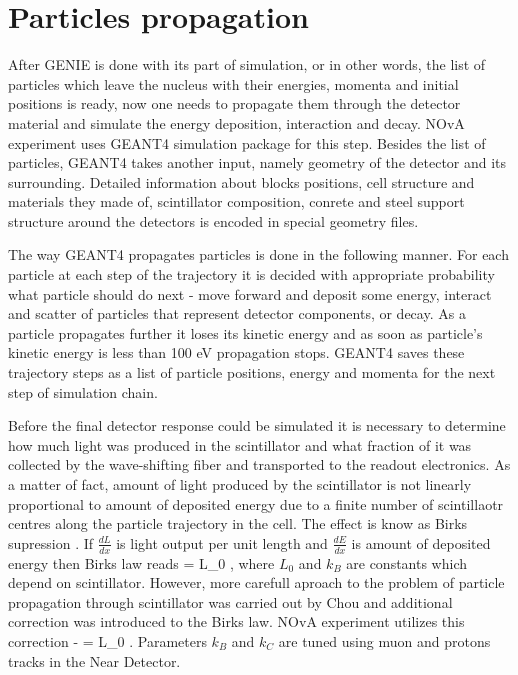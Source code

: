 \section{Particles propagation}
After GENIE is done with its part of simulation, or in other words, the list of particles which leave 
the nucleus with their energies, momenta and initial positions is ready, now one needs to propagate them
through the detector material and simulate the energy deposition, interaction and decay. NOvA experiment
uses GEANT4 \cite{GEANT4} simulation package for this step. Besides the list of particles, GEANT4 takes
another input, namely geometry of the detector and its surrounding. Detailed information about blocks 
positions, cell structure and materials they made of, scintillator composition, conrete and steel support
structure around the detectors is encoded in special geometry files.

The way GEANT4 propagates particles is done in the following manner. For each particle at each step of the 
trajectory it is decided with appropriate probability what particle should do next - move forward and deposit 
some energy, interact and scatter of particles that represent detector components, or decay. As a particle
propagates further it loses its kinetic energy and as soon as particle's kinetic energy is less than 100 eV
propagation stops. GEANT4 saves these trajectory steps as a list of particle positions, energy and momenta 
for the next step of simulation chain. 

Before the final detector response could be simulated it is necessary to determine how much light was produced
in the scintillator and what fraction of it was collected by the wave-shifting fiber and transported to the 
readout electronics. As a matter of fact, amount of light produced by the scintillator is not linearly 
proportional to amount of deposited energy due to a finite number of scintillaotr centres along the particle
trajectory in the cell. The effect is know as Birks supression \cite{birks}. If $\frac{dL}{dx}$ is light 
output per unit length and $\frac{dE}{dx}$ is amount of deposited energy then Birks law reads
\be
{} = L_0 , 
\ee
where $L_0$ and $k_B$ are constants which depend on scintillator. However, more carefull aproach to the problem
of particle propagation through scintillator was carried out by Chou \cite{chou} and additional correction was
introduced to the Birks law. NOvA experiment utilizes this correction - 
\be
{} = L_0 .
\ee
Parameters $k_B$ and $k_C$ are tuned using muon and protons tracks in the Near Detector.

